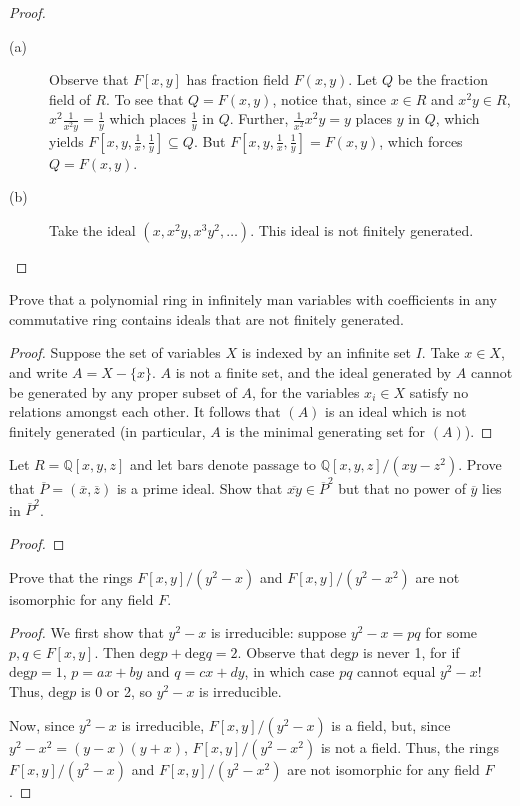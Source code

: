 \documentclass[12pt,leqno]{book}
\numberwithin{equation}{section}
\newcommand{\question}[2] {\vspace{.25in}\noindent\fbox{#1} #2 \vspace{.10in}}
\theoremstyle{definition}
\begin{document}
\begin{proof}\indent
\begin{description}
 \item [(a)] Observe that $F[x,y]$ has fraction field $F(x,y)$. Let $Q$ be the fraction field of $R$. To see that $Q=F(x,y)$, notice that, since $x\in R$ and $x^2y\in R$, $x^2\frac{1}{x^2y}=\frac{1}{y}$ which places $\frac{1}{y}$ in $Q$. Further, $\frac{1}{x^2}x^2y=y$ places $y$ in $Q$, which yields $F[x,y,\frac{1}{x},\frac{1}{y}]\subseteq Q$. But $F[x,y,\frac{1}{x},\frac{1}{y}]=F(x,y)$, which forces $Q=F(x,y)$.
 \item [(b)] Take the ideal $(x,x^2y,x^3y^2,\hdots)$. This ideal is not finitely generated.\qedhere
\end{description}

\end{proof}

\question{9}{Prove that a polynomial ring in infinitely man variables with coefficients in any commutative ring contains ideals that are not finitely generated.}

\begin{proof}
 Suppose the set of variables $X$ is indexed by an infinite set $I$. Take $x\in X$, and write $A=X-\{x\}$. $A$ is not a finite set, and the ideal generated by $A$ cannot be generated by any proper subset of $A$, for the variables $x_i\in X$ satisfy no relations amongst each other. It follows that $(A)$ is an ideal which is not finitely generated (in particular, $A$ is the minimal generating set for $(A)$).
\end{proof}


\question{12}{Let $R=\mathbb{Q}[x,y,z]$ and let bars denote passage to $\mathbb{Q}[x,y,z]/(xy-z^2)$. Prove that $\overline{P}=(\overline{x},\overline{z})$ is a prime ideal. Show that $\overline{xy}\in\overline{P}^2$ but that no power of $\overline{y}$ lies in $\overline{P}^2$.}

\begin{proof}

\end{proof}

\question{13}{Prove that the rings $F[x,y]/(y^2-x)$ and $F[x,y]/(y^2-x^2)$ are not isomorphic for any field $F$.}

\begin{proof}
We first show that $y^2-x$ is irreducible: suppose $y^2-x=pq$ for some $p,q\in F[x,y]$. Then $\text{deg}p+\text{deg}q=2$. Observe that $\text{deg}p$ is never 1, for if $\text{deg}p=1$, $p=ax+by$ and $q=cx+dy$, in which case $pq$ cannot equal $y^2-x$! Thus, $\text{deg}p$ is 0 or 2, so $y^2-x$ is irreducible.

Now, since $y^2-x$ is irreducible, $F[x,y]/(y^2-x)$ is a field, but, since $y^2-x^2=(y-x)(y+x)$, $F[x,y]/(y^2-x^2)$ is not a field. Thus, the rings $F[x,y]/(y^2-x)$ and $F[x,y]/(y^2-x^2)$ are not isomorphic for any field $F$.
\end{proof}
\end{document}
